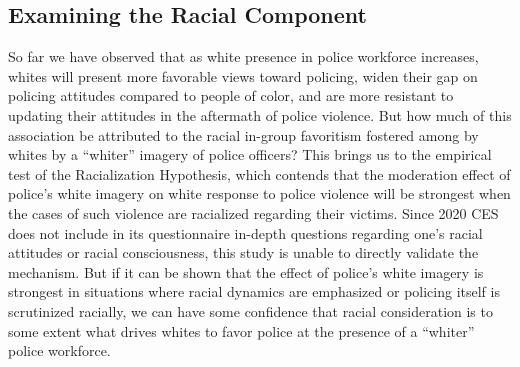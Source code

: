 \documentclass[
  12pt,
]{article}
\begin{document}
\hypertarget{examining-the-racial-component}{%
\subsection{Examining the Racial
Component}\label{examining-the-racial-component}}

So far we have observed that as white presence in police workforce
increases, whites will present more favorable views toward policing,
widen their gap on policing attitudes compared to people of color, and
are more resistant to updating their attitudes in the aftermath of
police violence. But how much of this association be attributed to the
racial in-group favoritism fostered among by whites by a ``whiter''
imagery of police officers? This brings us to the empirical test of the
Racialization Hypothesis, which contends that the moderation effect of
police's white imagery on white response to police violence will be
strongest when the cases of such violence are racialized regarding their
victims. Since 2020 CES does not include in its questionnaire in-depth
questions regarding one's racial attitudes or racial consciousness, this
study is unable to directly validate the mechanism. But if it can be
shown that the effect of police's white imagery is strongest in
situations where racial dynamics are emphasized or policing itself is
scrutinized racially, we can have some confidence that racial
consideration is to some extent what drives whites to favor police at
the presence of a ``whiter'' police workforce.
\end{document}
